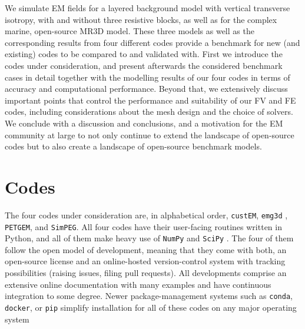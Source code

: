 \documentclass[
    paper,
  ]{geophysics}
\newcommand{\emg}[2]{\texttt{emg#1#2}\xspace}
\newcommand{\simpeg}{\texttt{SimPEG}\xspace}
\newcommand{\custem}{\texttt{custEM}\xspace}
\newcommand{\petgem}{\texttt{PETGEM}\xspace}
\begin{document}
We simulate EM fields for a layered background model with vertical transverse isotropy, with and without three resistive blocks, as well as for the complex marine, open-source MR3D model. These three models as well as the corresponding results from four different codes provide a benchmark for new (and existing) codes to be compared to and validated with. First we introduce the codes under consideration, and present afterwards the considered benchmark cases in detail together with the modelling results of our four codes in terms of accuracy and computational performance. Beyond that, we extensively discuss important points that control the performance and suitability of our FV and FE codes, including considerations about the mesh design and the choice of solvers. We conclude with a discussion and conclusions, and a motivation for the EM community at large to not only continue to extend the landscape of open-source codes but to also create a landscape of open-source benchmark models.

\section{Codes}

The four codes under consideration are, in alphabetical order, \custem \citep{GEO.19.Rochlitz}, \emg3d \citep{JOSS.19.Werthmuller}, \petgem \citep{CAG.18.CastilloReyes, GJI.19.CastilloReyes}, and \simpeg \citep{CAG.15.Cockett, CAG.17.Heagy}. All four codes have their user-facing routines written in Python, and all of them make heavy use of \texttt{NumPy} \citep{NAT.20.Harris} and \texttt{SciPy} \citep{NM.20.Virtanen}. The four of them follow the open model of development, meaning that they come with both, an open-source license and an online-hosted version-control system with tracking possibilities (raising issues, filing pull requests). All developments comprise an extensive online documentation with many examples and have continuous integration to some degree. Newer package-management systems such as \texttt{conda}, \texttt{docker}, or \texttt{pip} simplify installation for all of these codes on any major operating system
\end{document}
